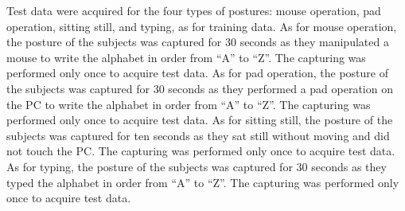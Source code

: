 \begin{deletedblock}
Test data were acquired for the four types of postures: mouse operation, pad operation, sitting still, and typing, as for training data. 
As for mouse operation, the posture of the subjects was captured for 30 seconds as they manipulated a mouse to write the alphabet in order from ``A'' to ``Z''. The capturing was performed only once to acquire test data.
As for pad operation, the posture of the subjects was captured for 30 seconds as they performed a pad operation on the PC to write the alphabet in order from ``A'' to ``Z''. The capturing was performed only once to acquire test data. 
As for sitting still, the posture of the subjects was captured for ten seconds as they sat still without moving and did not touch the PC. The capturing was performed only once to acquire test data. 
As for typing, the posture of the subjects was captured for 30 seconds as they typed the alphabet in order from ``A'' to ``Z''. The capturing was performed only once to acquire test data.
\end{deletedblock}

\begin{deletedblock}
\begin{table}[b]
  \centering
  \caption{Test data acquisition conditions for each posture class.}
  \label{testacquisition}
\end{table}
\end{deletedblock}

